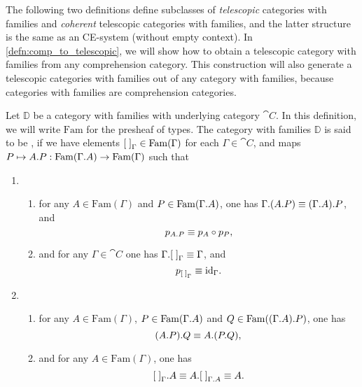 The following two definitions define subclasses of \emph{telescopic} categories with families and 
\emph{coherent} telescopic categories with families, and the latter structure is the same as an CE-system
(without empty context). In \autoref{defn:comp_to_telescopic}, we will show how
to obtain a telescopic category with families from any comprehension category. This construction
will also generate a telescopic categories with families out of any category with families, because categories with families
are comprehension categories.

\begin{defn}
Let $\mathbb{D}$ be a category with families with underlying category $\cat{C}$. In this definition, we will write
$\mathrm{Fam}$ for the presheaf of types. The category with families $\mathbb{D}$
is said to be , if we have elements ${[\;]}_{\Gamma}\in
\mathrm{Fam}(\Gamma)$ for each $\Gamma\in\cat{C}$, and maps 
$P\mapsto\ctxext{A}{P}:\mathrm{Fam}(\ctxext{\Gamma}{A})\to \mathrm{Fam}(\Gamma)$
such that
\begin{enumerate}
\item 
\begin{enumerate}
\item for any $A\in\mathrm{Fam}(\Gamma)$ and $P\in\mathrm{Fam}(\ctxext{\Gamma}{A})$,
one has $\ctxext{\Gamma}{{A}{P}}\jdeq\ctxext{{\Gamma}{A}}{P}$, and
\begin{equation*}
p_{\ctxext{A}{P}}\jdeq p_A\circ p_P,
\end{equation*}
\item and for any $\Gamma\in\cat{C}$ one has $\ctxext{\Gamma}{\emptyf[\Gamma]}\jdeq\Gamma$, and
\begin{equation*}
p_{{[\;]}_{\Gamma}}\equiv{\mathrm{id}_{\Gamma}}.
\end{equation*}
\end{enumerate}
\item 
\begin{enumerate}
\item for any $A\in\mathrm{Fam}(\Gamma)$, $P\in\mathrm{Fam}(\ctxext{\Gamma}{A})$
and $Q\in\mathrm{Fam}(\ctxext{{\Gamma}{A}}{P})$, one has
\begin{equation*}
\ctxext{{A}{P}}{Q}\jdeq\ctxext{A}{{P}{Q}},
\end{equation*}
\item and for any $A\in\mathrm{Fam}(\Gamma)$, one has
\begin{equation*}
\ctxext{\emptyf[\Gamma]}{A}\jdeq\ctxext{A}{\emptyf[\ctxext{\Gamma}{A}]}\jdeq A.
\end{equation*}

\end{enumerate}
\end{enumerate}
\end{defn}
